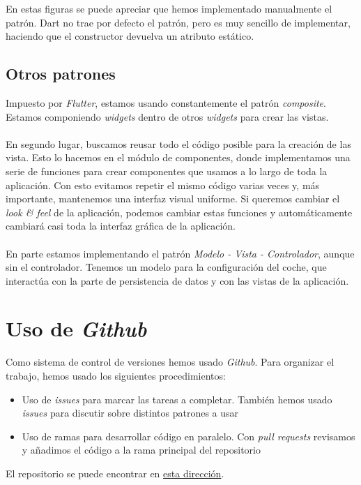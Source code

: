En estas figuras se puede apreciar que hemos implementado manualmente el patrón. Dart no trae por defecto el patrón, pero es muy sencillo de implementar, haciendo que el constructor devuelva un atributo estático.

\newpage

\subsection{Otros patrones}

Impuesto por \emph{Flutter}, estamos usando constantemente el patrón \emph{composite}. Estamos componiendo \emph{widgets} dentro de otros \emph{widgets} para crear las vistas.
\\\\
En segundo lugar, buscamos reusar todo el código posible para la creación de las vista. Esto lo hacemos en el módulo de componentes, donde implementamos una serie de funciones para crear componentes que usamos a lo largo de toda la aplicación. Con esto evitamos repetir el mismo código varias veces y, más importante, mantenemos una interfaz visual uniforme. Si queremos cambiar el \emph{look \& feel} de la aplicación, podemos cambiar estas funciones y automáticamente cambiará casi toda la interfaz gráfica de la aplicación.
\\\\
En parte estamos implementando el patrón \emph{Modelo - Vista - Controlador}, aunque sin el controlador. Tenemos un modelo para la configuración del coche, que interactúa con la parte de persistencia de datos y con las vistas de la aplicación.

\newpage

\section{Uso de \emph{Github}}

Como sistema de control de versiones hemos usado \emph{Github}. Para organizar el trabajo, hemos usado los siguientes procedimientos:

\begin{itemize}
    \item Uso de \emph{issues} para marcar las tareas a completar. También hemos usado \emph{issues} para discutir sobre distintos patrones a usar
    \item Uso de ramas para desarrollar código en paralelo. Con \emph{pull requests} revisamos y añadimos el código a la rama principal del repositorio
\end{itemize}

El repositorio se puede encontrar en \href{https://github.com/fervalnav/CarConfigurator}{esta dirección}.


